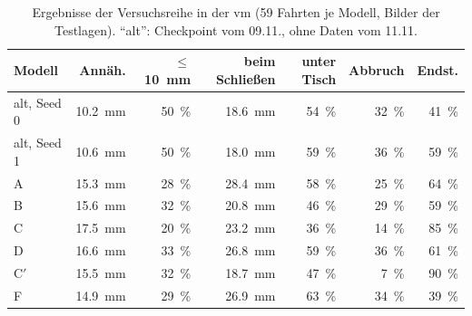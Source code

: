 \begin{table}[htbp]
  \centering
  \caption[Ergebnisse der Versuchsreihe in der VM]{Ergebnisse der Versuchsreihe in der
  \acs{vm} (59 Fahrten je Modell, Bilder der Testlagen). \enquote{alt}: Checkpoint vom 09.11.,
  ohne Daten vom 11.11.}
  \label{tab:varianten}
  \small
  \begin{tabular}{@{}l r r r r r r@{}}
    \toprule
    Modell & Annäh. & $\le$\SI{10}{mm} & beim Schließen & unter Tisch & Abbruch & Endst. \\
    \midrule
    alt, Seed 0 & \SI{10.2}{mm} & \SI{50}{\percent} & \SI{18.6}{mm} & \SI{54}{\percent} & \SI{32}{\percent} & \SI{41}{\percent} \\
    alt, Seed 1 & \SI{10.6}{mm} & \SI{50}{\percent} & \SI{18.0}{mm} & \SI{59}{\percent} & \SI{36}{\percent} & \SI{59}{\percent} \\
    A & \SI{15.3}{mm} & \SI{28}{\percent} & \SI{28.4}{mm} & \SI{58}{\percent} & \SI{25}{\percent} & \SI{64}{\percent} \\
    B & \SI{15.6}{mm} & \SI{32}{\percent} & \SI{20.8}{mm} & \SI{46}{\percent} & \SI{29}{\percent} & \SI{59}{\percent} \\
    C & \SI{17.5}{mm} & \SI{20}{\percent} & \SI{23.2}{mm} & \SI{36}{\percent} & \SI{14}{\percent} & \SI{85}{\percent} \\
    D & \SI{16.6}{mm} & \SI{33}{\percent} & \SI{26.8}{mm} & \SI{59}{\percent} & \SI{36}{\percent} & \SI{61}{\percent} \\
    C$'$ & \SI{15.5}{mm} & \SI{32}{\percent} & \SI{18.7}{mm} & \SI{47}{\percent} & \SI{7}{\percent} & \SI{90}{\percent} \\
    F & \SI{14.9}{mm} & \SI{29}{\percent} & \SI{26.9}{mm} & \SI{63}{\percent} & \SI{34}{\percent} & \SI{39}{\percent} \\
    \bottomrule
  \end{tabular}
\end{table}

